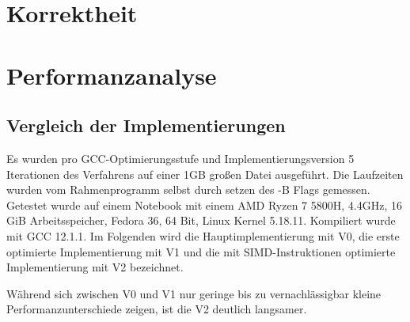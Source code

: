 \documentclass[course=erap]{aspdoc}
\begin{document}
\section{Korrektheit}

\section{Performanzanalyse}
\subsection{Vergleich der Implementierungen}
Es wurden pro GCC-Optimierungsstufe und Implementierungsversion 5 
Iterationen des Verfahrens auf einer 1GB großen Datei ausgeführt.
Die Laufzeiten wurden vom Rahmenprogramm selbst durch setzen des -B Flags
gemessen. Getestet wurde auf einem Notebook mit einem AMD Ryzen 7 5800H, 
4.4GHz, 16 GiB Arbeitsspeicher, Fedora 36, 64 Bit, Linux Kernel 5.18.11.
Kompiliert wurde mit GCC 12.1.1.
Im Folgenden wird die Hauptimplementierung mit V0, die erste optimierte Implementierung
mit V1 und die mit SIMD-Instruktionen optimierte Implementierung mit V2 bezeichnet.

\begin{center}
\end{center}
Während sich zwischen V0 und V1 nur geringe bis zu vernachlässigbar kleine 
Performanzunterschiede zeigen, ist die V2 deutlich langsamer.
\end{document}
